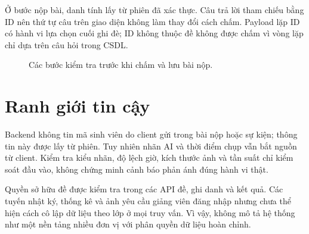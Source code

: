 Ở bước nộp bài, danh tính lấy từ phiên đã xác thực. Câu trả lời tham chiếu bằng ID nên thứ tự câu trên giao diện không làm thay đổi cách chấm. Payload lặp ID có hành vi lựa chọn cuối ghi đè; ID không thuộc đề không được chấm vì vòng lặp chỉ dựa trên câu hỏi trong CSDL.
\begin{figure}[H]\centering
\caption{Các bước kiểm tra trước khi chấm và lưu bài nộp.}\end{figure}

\section{Ranh giới tin cậy}
Backend không tin mã sinh viên do client gửi trong bài nộp hoặc sự kiện; thông tin này được lấy từ phiên. Tuy nhiên nhãn AI và thời điểm chụp vẫn bắt nguồn từ client. Kiểm tra kiểu nhãn, độ lệch giờ, kích thước ảnh và tần suất chỉ kiểm soát đầu vào, không chứng minh cảnh báo phản ánh đúng hành vi thật.

Quyền sở hữu đề được kiểm tra trong các API đề, ghi danh và kết quả. Các tuyến nhật ký, thống kê và ảnh yêu cầu giảng viên đăng nhập nhưng chưa thể hiện cách cô lập dữ liệu theo lớp ở mọi truy vấn. Vì vậy, không mô tả hệ thống như một nền tảng nhiều đơn vị với phân quyền dữ liệu hoàn chỉnh.
